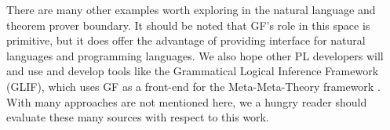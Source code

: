 There are many other examples worth exploring in the natural language and
theorem prover boundary. It should be noted that GF's role in this space is
primitive, but it does offer the advantage of providing interface for natural
languages and programming languages. We also hope other PL developers will and
use and develop tools like the Grammatical Logical Inference Framework (GLIF),
which uses GF as a front-end for the Meta-Meta-Theory framework
\cite{schaefer2020glif}. With many approaches are not mentioned here, we a
hungry reader should evaluate these many sources with respect to this work.
